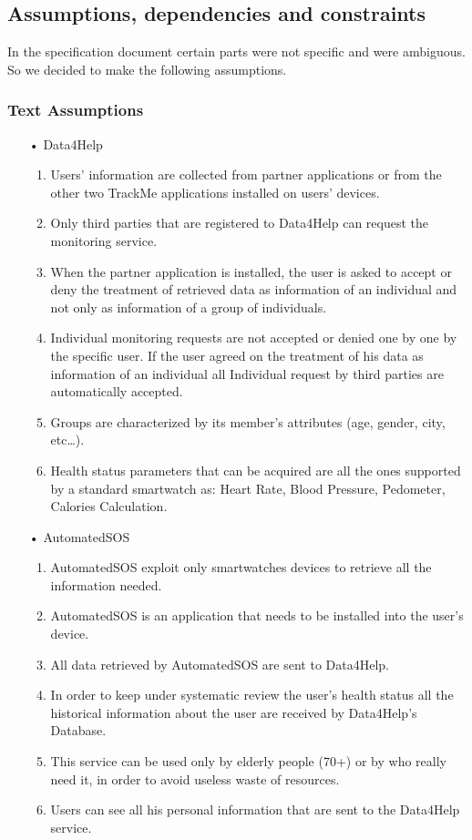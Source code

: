 \subsection{Assumptions, dependencies and constraints}
In the specification document certain parts were not specific and were ambiguous. So we decided to make the following assumptions.

\subsubsection{Text Assumptions}
\begin{enumerate}

\item[•] {\Large Data4Help}
	\begin{enumerate}
	\item Users' information are collected from partner applications or from the other two TrackMe applications installed on users' devices.
	\item Only third parties that are registered to Data4Help can request the monitoring service.
	\item When the partner application is installed, the user is asked to accept or deny the treatment of retrieved data as information of an individual and not only as information of a group of individuals.
	\item Individual monitoring requests are not accepted or denied one by one by the specific user. If the user agreed on the treatment of his data as information of an individual all Individual request by third parties are automatically accepted.	
	\item Groups are characterized by its member’s attributes (age, gender, city, etc…).
	\item Health status parameters that can be acquired are all the ones supported by a standard smartwatch as: Heart Rate, Blood Pressure, Pedometer, Calories Calculation.
	\end{enumerate}
	
\item[•] {\Large AutomatedSOS}
	\begin{enumerate}
	\item AutomatedSOS exploit only smartwatches devices to retrieve all the information needed.
	\item AutomatedSOS is an application that needs to be installed into the user's device.
	\item All data retrieved by AutomatedSOS are sent to Data4Help.
	\item In order to keep under systematic review the user's health status all the historical information about the user are received by Data4Help's Database.
    \item This service can be used only by elderly people (70+) or by who really need it, in order to avoid useless waste of resources.
    \item Users can see all his personal information that are sent to the Data4Help service. 
	\end{enumerate}
	

\end{enumerate}
